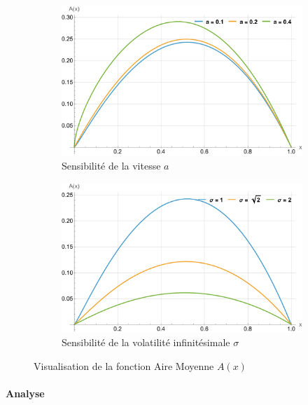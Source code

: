 \begin{figure}[htb]
    \centering
    \begin{subfigure}{0.45\linewidth}
        \includegraphics[width=\linewidth]{img/validation/Area/area_a.pdf}
        \caption{Sensibilité de la vitesse $a$}\label{fig:Area_a_visualisation}
    \end{subfigure}
    \hfill
    \begin{subfigure}{0.45\linewidth}
        \includegraphics[width=\linewidth]{img/validation/Area/area_sigma.pdf}
        \caption{Sensibilité de la volatilité infinitésimale $\sigma$}\label{fig:Area_sigma_visualisation}
    \end{subfigure}
    \caption{Visualisation de la fonction Aire Moyenne $A(x)$}\label{fig:AreaVisualisation}
\end{figure}
\FloatBarrier\paragraph{Analyse}\phantom{}\\
